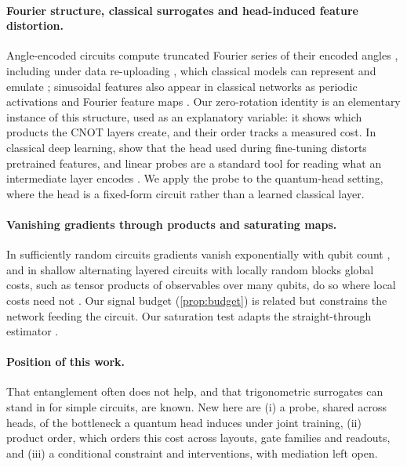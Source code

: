\paragraph{Fourier structure, classical surrogates and head-induced feature distortion.}
Angle-encoded circuits compute truncated Fourier series of their encoded angles
\citep{schuld2021}, including under data re-uploading \citep{perez2020}, which classical models can represent and emulate
\citep{schreiber2023}; sinusoidal features also appear in classical networks as periodic
activations and Fourier feature maps \citep{sitzmann2020,tancik2020}. Our zero-rotation
identity is an elementary instance of this structure, used as an explanatory variable: it
shows which products the CNOT layers create, and their order tracks a measured cost. In classical deep learning, \citet{kumar2022} show that the
head used during fine-tuning distorts pretrained features, and linear probes are a standard
tool for reading what an intermediate layer encodes \citep{alain2017}. We apply the probe
to the quantum-head setting, where the head is a fixed-form circuit rather than a learned
classical layer.

\paragraph{Vanishing gradients through products and saturating maps.}
In sufficiently random circuits gradients vanish exponentially with qubit count \citep{mcclean2018}, and in shallow alternating layered circuits with locally random blocks global costs, such as tensor products of observables over many qubits, do so where local costs need not \citep{cerezo2021cost}. Our signal budget (\cref{prop:budget}) is related but constrains the network feeding the circuit. Our saturation test adapts the straight-through estimator \citep{bengio2013}.

\paragraph{Position of this work.}
That entanglement often does not help, and that trigonometric surrogates can stand in for simple
circuits, are known. New here are (i) a probe, shared across heads, of the bottleneck a quantum head
induces under joint training, (ii) product order, which orders this cost across layouts, gate families
and readouts, and (iii) a conditional constraint and interventions, with mediation left open.
